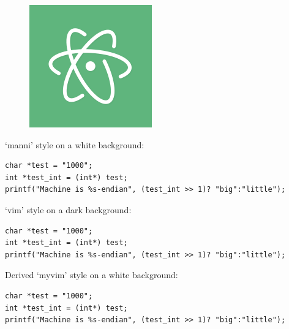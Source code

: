 \lipsum[1]
\begin{figure}
	\includegraphics[width=0.19\paperwidth]{./img/editors/atom}
\end{figure}
\lipsum[1]

`manni' style on a white background:
\begin{verbatim}
char *test = "1000";
int *test_int = (int*) test;
printf("Machine is %s-endian", (test_int >> 1)? "big":"little");    
\end{verbatim}

`vim' style on a dark background:
\begin{verbatim}
char *test = "1000";
int *test_int = (int*) test;
printf("Machine is %s-endian", (test_int >> 1)? "big":"little");  
\end{verbatim}

Derived `myvim' style on a white background:
\begin{verbatim}
char *test = "1000";
int *test_int = (int*) test;
printf("Machine is %s-endian", (test_int >> 1)? "big":"little");  
\end{verbatim}